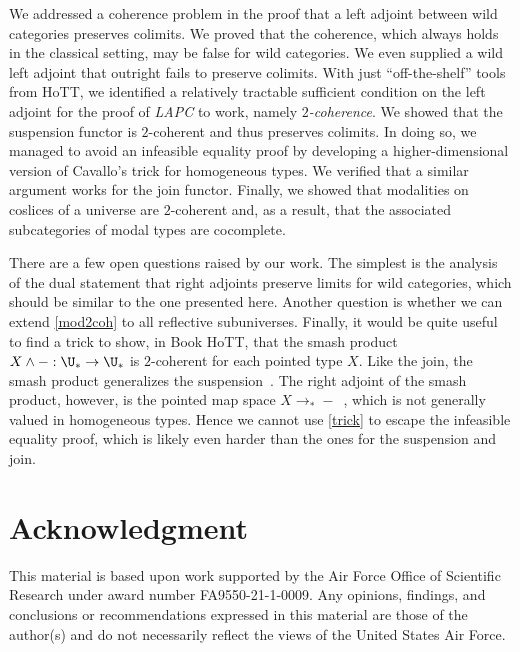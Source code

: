 \documentclass{lmcs}
\theoremstyle{definition}\newtheorem{note}[thm]{Note}
\begin{document}
We addressed a coherence problem in the proof that a left adjoint between wild categories preserves colimits. We proved that the coherence, which always holds in the classical setting, may be false for wild categories. We even supplied a wild left adjoint that outright fails to preserve colimits. With just ``off-the-shelf'' tools from HoTT, we identified a relatively tractable sufficient condition on the left adjoint for the proof of \emph{LAPC} to work, namely \emph{$2$-coherence}. We showed that the suspension functor is $2$-coherent and thus preserves colimits. In doing so, we managed to avoid an infeasible equality proof by developing a higher-dimensional version of Cavallo's trick for homogeneous types. We verified that a similar argument works for the join functor. Finally, we showed that modalities on coslices of a universe are $2$-coherent and, as a result, that the associated subcategories of modal types are cocomplete.

There are a few open questions raised by our work. The simplest is the analysis of the dual statement that right adjoints preserve limits for wild categories, which should be similar to the one presented here. Another question is whether we can extend \autoref{mod2coh} to all reflective subuniverses.
Finally, it would be quite useful to find a trick to show, in Book HoTT, that the smash product $X \land {-} : \U_{\ast} \to \U_{\ast}$ is $2$-coherent for each pointed type $X$. Like the join, the smash product generalizes the suspension~\cite[Proposition 4.2.1]{brunthesis}. The right adjoint of the smash product, however, is the pointed map space $X \to_{\ast} {-}$~\cite[Theorem 4.3.28]{vanDoornthesis}, which is not generally valued in homogeneous types. Hence we cannot use \autoref{trick} to escape the infeasible equality proof, which is likely even harder than the ones for the suspension and join.

\section*{Acknowledgment}
This material is based upon work supported by the Air Force Office of Scientific Research under award number FA9550-21-1-0009.
Any opinions, findings, and conclusions or recommendations expressed in this material are those of the author(s) and do not
necessarily reflect the views of the United States Air Force.



\end{document}
